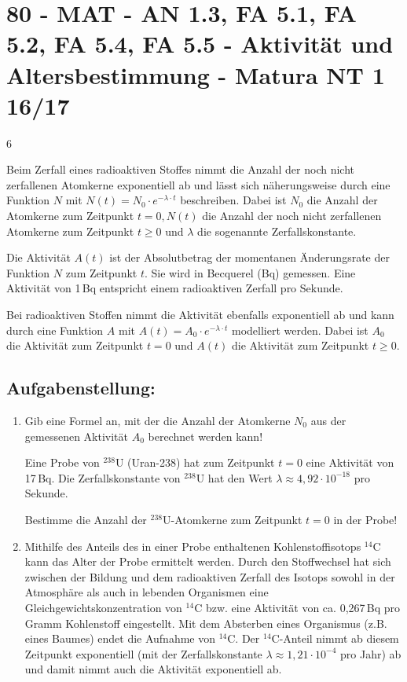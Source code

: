 \section{80 - MAT - AN 1.3, FA 5.1, FA 5.2, FA 5.4, FA 5.5 - Aktivität und Altersbestimmung - Matura NT 1 16/17}


\begin{langesbeispiel} \item[6] %

Beim Zerfall eines radioaktiven Stoffes nimmt die Anzahl der noch nicht zerfallenen Atomkerne exponentiell ab und lässt sich näherungsweise durch eine Funktion $N$ mit $N(t)=N_0\cdot e^{-\lambda\cdot t}$ beschreiben. Dabei ist $N_0$ die Anzahl der Atomkerne zum Zeitpunkt $t=0, N(t)$ die Anzahl der noch nicht zerfallenen Atomkerne zum Zeitpunkt $t\geq 0$ und $\lambda$ die sogenannte Zerfallskonstante.

Die Aktivität $A(t)$ ist der Absolutbetrag der momentanen Änderungsrate der Funktion $N$ zum Zeitpunkt $t$. Sie wird in Becquerel (Bq) gemessen. Eine Aktivität von 1\,Bq entspricht einem radioaktiven Zerfall pro Sekunde.

Bei radioaktiven Stoffen nimmt die Aktivität ebenfalls exponentiell ab und kann durch eine Funktion $A$ mit $A(t)=A_0\cdot e^{-\lambda\cdot t}$ modelliert werden. Dabei ist $A_0$ die Aktivität zum Zeitpunkt $t=0$ und $A(t)$ die Aktivität zum Zeitpunkt $t\geq 0$.

\subsection{Aufgabenstellung:}
\begin{enumerate}
	\item Gib eine Formel an, mit der die Anzahl der Atomkerne $N_0$ aus der gemessenen Aktivität $A_0$ berechnet werden kann!\leer
	
	Eine Probe von $^{238}$U (Uran-238) hat zum Zeitpunkt $t=0$ eine Aktivität von 17\,Bq. Die Zerfallskonstante von $^{238}$U hat den Wert $\lambda\approx 4,92\cdot 10^{-18}$ pro Sekunde.
	
	Bestimme die Anzahl der $^{238}$U-Atomkerne zum Zeitpunkt $t=0$ in der Probe!\leer
	
	\item Mithilfe des Anteils des in einer Probe enthaltenen Kohlenstoffisotops $^{14}$C kann das Alter der Probe ermittelt werden. Durch den Stoffwechsel hat sich zwischen der Bildung und dem radioaktiven Zerfall des Isotops sowohl in der Atmosphäre als auch in lebenden Organismen eine Gleichgewichtskonzentration von $^{14}$C bzw. eine Aktivität von ca. 0,267\,Bq pro Gramm Kohlenstoff eingestellt. Mit dem Absterben eines Organismus (z.B. eines Baumes) endet die Aufnahme von $^{14}$C. Der $^{14}$C-Anteil nimmt ab diesem Zeitpunkt exponentiell (mit der Zerfallskonstante $\lambda\approx 1,21\cdot 10^{-4}$ pro Jahr) ab und damit nimmt auch die Aktivität exponentiell ab.\leer
	

\end{enumerate}
\end{langesbeispiel}
